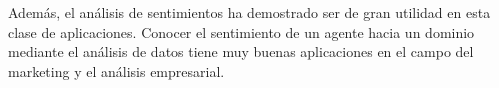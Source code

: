 \documentclass[12pt]{report} %
\begin{document}
Además, el análisis de sentimientos ha demostrado ser de gran utilidad en esta clase de aplicaciones. Conocer el sentimiento de un agente hacia un dominio mediante el análisis de datos tiene muy buenas aplicaciones en el campo del marketing y el análisis empresarial.


\clearpage

{}
\label{chap:bibliography}
\printbibliography




\end{document}
